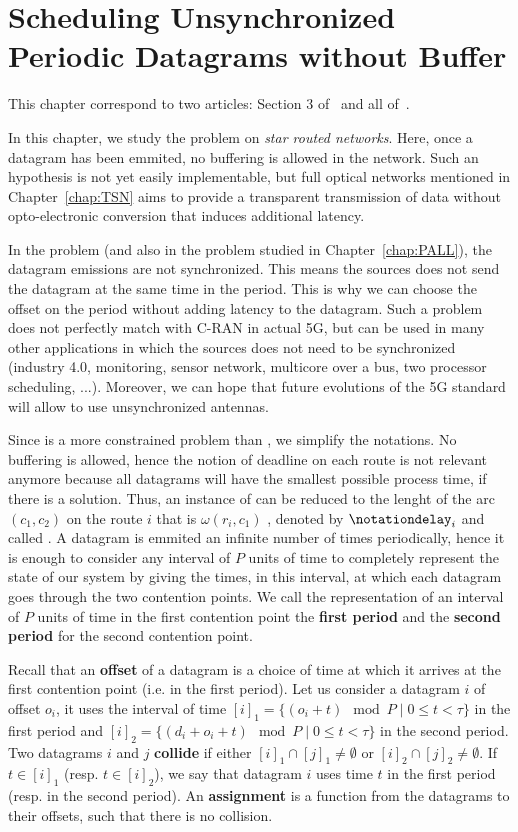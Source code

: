 
\chapter{Scheduling Unsynchronized Periodic Datagrams without Buffer}
\label{chap:PAZL}
\minitoc


This chapter correspond to two articles: Section $3$ of~\cite{DBLP:conf/ict/BarthGLMS18} and all of~\cite{DBLP:journals/corr/abs-2002-07606}.


 In this chapter, we study the problem \pazl on \emph{star routed networks}. Here, once a datagram has been emmited, no buffering is allowed in the network. Such an hypothesis is not yet easily implementable, but full optical networks mentioned in Chapter~\ref{chap:TSN} aims to provide a transparent transmission of data without opto-electronic conversion that induces additional latency. 

 In the problem \pazl (and also in the problem \pall studied in Chapter~\ref{chap:PALL}), the datagram emissions are not synchronized. This means the sources does not send the datagram at the same time in the period. This is why we can choose the offset on the period without adding latency to the datagram. Such a problem does not perfectly match with C-RAN in actual 5G, but can be used in many other applications in which the sources does not need to be synchronized (industry 4.0, monitoring, sensor network, multicore over a bus, two processor scheduling, ...).  Moreover, we can hope that future evolutions of the 5G standard will allow to use unsynchronized antennas.

 Since \pazl is a more constrained problem than \pall, we simplify the notations. No buffering is allowed, hence the notion of deadline on each route is not relevant anymore because all datagrams will have the smallest possible process time, if there is a solution. Thus, an instance of \pazl can be reduced to the lenght of the arc $(c_1,c_2)$ on the route $i$ that is $\omega(r_i,c_1)$ , denoted by $\notationdelay_i$ and called \nomdelay. A datagram is emmited an infinite number of times periodically, hence it is enough to consider any interval of $P$ units of time to completely represent the state of our system by giving the times, in this interval, at which each datagram goes through the two contention points. We call the representation of an interval of $P$ units of time in the first contention point the \textbf{first period} and the \textbf{second period} for the second contention point. 

 Recall that an \textbf{offset} of a datagram is a choice of time at which it arrives
 at the first contention point (i.e. in the first period). Let us consider a datagram $i$
 of offset $o_i$, it uses the interval of time $[i]_1 = \{ (o_i + t) \mod P \mid 0 \leq t < \tau \}$ in the first period and $[i]_2 = \{ (d_i + o_i + t) \mod P \mid 0 \leq t < \tau \}$ in the second period. Two datagrams $i$ and $j$ \textbf{collide} if either $[i]_1 \cap [j]_1 \neq \emptyset $ or $[i]_2 \cap [j]_2 \neq \emptyset $. If $t \in [i]_1$ (resp. $t \in [i]_2$), we say that datagram $i$ uses time $t$ in the first period (resp. in the second period). An \textbf{assignment} is a function from the datagrams to their offsets, such that there is no collision.



